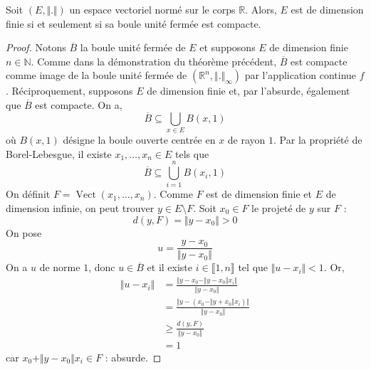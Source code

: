   \begin{theorem}[Riesz]
    Soit $(E, \Vert . \Vert)$ un espace vectoriel normé sur le corps $\mathbb{R}$. Alors, $E$ est de dimension finie si et seulement si sa boule unité fermée est compacte.
  \end{theorem}

  \begin{proof}
    Notons $\overline{B}$ la boule unité fermée de $E$ et supposons $E$ de dimension finie $n \in \mathbb{N}$. Comme dans la démonstration du théorème précédent, $\overline{B}$ est compacte comme image de la boule unité fermée de $(\mathbb{R}^n, \Vert . \Vert_\infty)$ par l'application continue $f$. Réciproquement, supposons $E$ de dimension finie et, par l'absurde, également que $\overline{B}$ est compacte. On a,
    \[ \overline{B} \subseteq \bigcup_{x \in E} B(x,1) \]
    où $B(x,1)$ désigne la boule ouverte centrée en $x$ de rayon $1$. Par la propriété de Borel-Lebesgue, il existe $x_1, \dots, x_n \in E$ tels que
    \[ \overline{B} \subseteq \bigcup_{i=1}^n B(x_i,1) \]
    On définit $F = \operatorname{Vect}(x_1, \dots, x_n)$. Comme $F$ est de dimension finie et $E$ de dimension infinie, on peut trouver $y \in E \setminus F$. Soit $x_0 \in F$ le projeté de $y$ sur $F$ :
    \[ d(y, F) = \Vert y - x_0 \Vert > 0 \]
    On pose
    \[ u = \frac{y - x_0}{\Vert y - x_0 \Vert} \]
    On a $u$ de norme $1$, donc $u \in \overline{B}$ et il existe $i \in \llbracket 1, n \rrbracket$ tel que $\Vert u - x_i \Vert < 1$. Or,
    \begin{align*}
      \Vert u - x_i \Vert &= \frac{\Vert y - x_0 - \Vert y - x_0 \Vert x_i \Vert}{\Vert y - x_0 \Vert} \\
      &= \frac{\Vert y - (x_0 - \Vert y + x_0 \Vert x_i) \Vert}{\Vert y - x_0 \Vert} \\
      &\geq \frac{d(y, F)}{\Vert y - x_0 \Vert} \\
      &= 1
    \end{align*}
    car $x_0 + \Vert y - x_0 \Vert x_i \in F$ : absurde.
  \end{proof}

